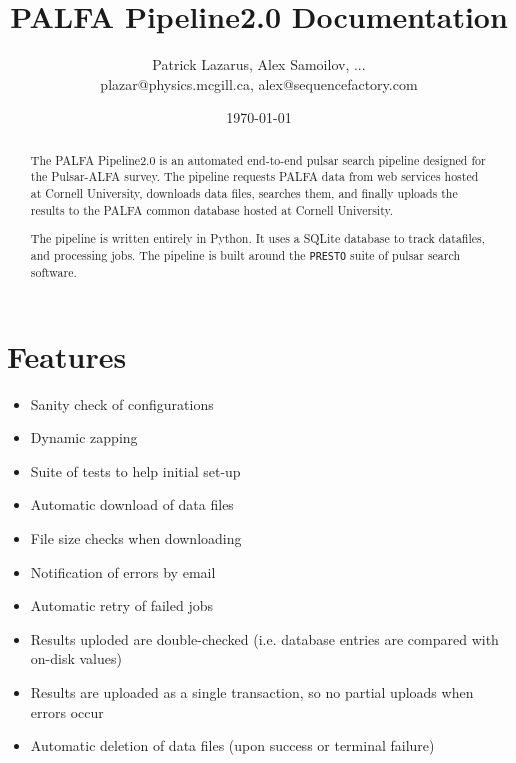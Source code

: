\documentclass[12pt]{article}
\begin{document}
\title{PALFA Pipeline2.0 Documentation}
\author{Patrick Lazarus, Alex Samoilov, ... \\
        plazar@physics.mcgill.ca, alex@sequencefactory.com}
\date{\today}

\maketitle

\begin{abstract}
The PALFA Pipeline2.0 is an automated end-to-end pulsar search pipeline designed for the Pulsar-ALFA survey. The pipeline requests PALFA data from web services hosted at Cornell University, downloads data files, searches them, and finally uploads the results to the PALFA common database hosted at Cornell University.

The pipeline is written entirely in Python. It uses a SQLite database to track datafiles, and processing jobs. The pipeline is built around the \texttt{PRESTO} suite of pulsar search software. 
\end{abstract}

\clearpage

\tableofcontents

\clearpage

\section{Features}
\begin{itemize}
    \item Sanity check of configurations
    \item Dynamic zapping
    \item Suite of tests to help initial set-up
    \item Automatic download of data files
    \item File size checks when downloading
    \item Notification of errors by email
    \item Automatic retry of failed jobs
    \item Results uploded are double-checked (i.e. database entries are compared with on-disk values)
    \item Results are uploaded as a single transaction, so no partial uploads when errors occur
    \item Automatic deletion of data files (upon success or terminal failure)
\end{itemize}
\end{document}
